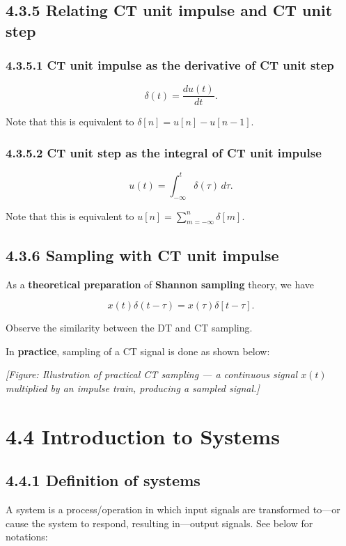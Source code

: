 \documentclass[11pt]{article}
\begin{document}
\subsection*{4.3.5 Relating CT unit impulse and CT unit step}

\subsubsection*{4.3.5.1 CT unit impulse as the derivative of CT unit step}

\[\delta(t) = \frac{du(t)}{dt}.\]

Note that this is equivalent to $\delta[n] = u[n] - u[n-1]$.

\subsubsection*{4.3.5.2 CT unit step as the integral of CT unit impulse}

\[u(t) = \int_{-\infty}^{t} \delta(\tau)\, d\tau.\]

Note that this is equivalent to $u[n] = \sum_{m=-\infty}^{n} \delta[m]$.

\subsection*{4.3.6 Sampling with CT unit impulse}

As a \textbf{theoretical preparation} of \textbf{Shannon sampling} theory, we have

\[x(t)\delta(t - \tau) = x(\tau)\delta[t - \tau].\]

Observe the similarity between the DT and CT sampling.

In \textbf{practice}, sampling of a CT signal is done as shown below:

\textit{[Figure: Illustration of practical CT sampling — a continuous signal $x(t)$ multiplied by an impulse train, producing a sampled signal.]}

\section*{4.4 Introduction to Systems}

\subsection*{4.4.1 Definition of systems}

A system is a process/operation in which input signals are transformed to—or cause the system to respond, resulting in—output signals. See below for notations:
\end{document}

